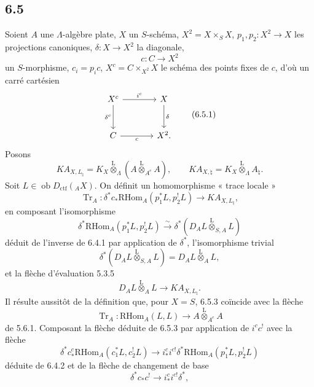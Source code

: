 \documentclass[11pt]{article}
\providecommand{\RHom}{\mathrm{RHom}}
\providecommand{\Tr}{\operatorname{Tr}}
\providecommand{\Tr}{\operatorname{Tr}}
\providecommand{\lten}{\overset{\mathrm L}{\otimes}}
\providecommand{\Ob}{\operatorname{ob}}
\providecommand{\Tr}{\operatorname{Tr}}
\providecommand{\RHom}{\mathrm{RHom}}
\providecommand{\lten}{\overset{\mathrm L}{\otimes}}
\providecommand{\RHom}{\mathrm R\mathcal{H}om}
\providecommand{\lten}{\overset{\mathrm L}{\otimes}}
\providecommand{\Ob}{\operatorname{ob}}
\providecommand{\Tr}{\operatorname{Tr}}
\providecommand{\lten}{\overset{\mathrm L}{\otimes}}
\providecommand{\lten}{\overset{\mathrm L}{\otimes}}
\providecommand{\Ob}{\operatorname{Ob}}
\providecommand{\lten}{\overset{\mathrm L}{\otimes}}
\begin{document}
\subsection*{6.5}
Soient $A$ une $\Lambda$-algèbre plate, $X$ un $S$-schéma, $X^2=X\times_SX$, $p_1,p_2:X^2\to X$ les projections canoniques, $\delta:X\to X^2$ la diagonale,
\[
c:C\longrightarrow X^2
\]
un $S$-morphisme, $c_i=p_ic$, $X^c=C\times_{X^2}X$ le schéma des points fixes de $c$, d'où un carré cartésien
\begin{equation}
\begin{tikzcd}[column sep=large,row sep=large]
X^c \arrow[r,"i^c"] \arrow[d,"\delta^c"'] & X \arrow[d,"\delta"]\\
C \arrow[r,"c"'] & X^2 .
\end{tikzcd}
\tag{6.5.1}
\end{equation}
Posons
\begin{equation}
KA_{X,L_{\natural}}=K_X\lten_{\Lambda}(A\lten_{A^e}A),
\qquad
KA_{X,\natural}=K_X\lten_{\Lambda}A_{\natural}.
\tag{6.5.2}
\end{equation}
Soit $L\in\Ob D_{\mathrm{ctf}}({}_AX)$. On définit un homomorphisme « trace locale »
\begin{equation}
\Tr_A:\delta^*c_*\RHom_A(p_1^*L,p_2^!L)
\longrightarrow
KA_{X,L_{\natural}},
\tag{6.5.3}
\end{equation}
en composant l'isomorphisme
\begin{equation}
\delta^*\RHom_A(p_1^*L,p_2^!L)
\xrightarrow{\sim}
\delta^*(D_AL\lten_{S,A}L)
\tag{6.5.4}
\end{equation}
déduit de l'inverse de 6.4.1 par application de $\delta^*$, l'isomorphisme trivial
\begin{equation}
\delta^*(D_AL\lten_{S,A}L)=D_AL\lten_AL,
\tag{6.5.5}
\end{equation}
et la flèche d'évaluation 5.3.5
\begin{equation}
D_AL\lten_AL\longrightarrow KA_{X,L_{\natural}}.
\tag{6.5.6}
\end{equation}
Il résulte aussitôt de la définition que, pour $X=S$, 6.5.3 coïncide avec la flèche
\[
\Tr_A:\RHom_A(L,L)\longrightarrow A\lten_{A^e}A
\]
de 5.6.1. Composant la flèche déduite de 6.5.3 par application de $i^cc^!$ avec la flèche
\begin{equation}
\delta^*c_*^c\RHom_A(c_1^*L,c_2^!L)
\longrightarrow
i_*^ci^{c!}\delta^*\RHom_A(p_1^*L,p_2^!L)
\tag{6.5.7}
\end{equation}
déduite de 6.4.2 et de la flèche de changement de base
\[
\delta^*c_*c^!\longrightarrow i_*^ci^{c!}\delta^*,
\]
\end{document}
